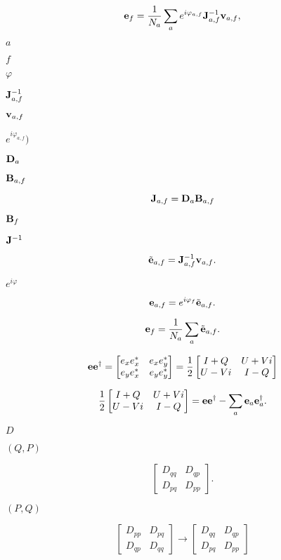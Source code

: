 \documentclass{article}
\begin{document}
\[ {\bf e}_f = \frac{1}{N_a} \sum_a e^{i\varphi_{a,f}} {\bf J}_{a,f}^{-1} {\bf v}_{a,f}, \]
\pagebreak

$a$
\pagebreak

$f$
\pagebreak

$\varphi$
\pagebreak

${\bf J}_{a,f}^{-1}$
\pagebreak

${\bf v}_{a,f}$
\pagebreak

$e^{i\varphi_{a,f}})$
\pagebreak

${\bf D}_a$
\pagebreak

${\bf B}_{a,f}$
\pagebreak

\[ {\bf J}_{a,f} = {\bf D}_a {\bf B}_{a,f} \]
\pagebreak

${\bf B}_f$
\pagebreak

${\bf J}^{-1}$
\pagebreak

\[ \tilde{\bf e}_{a,f} = {\bf J}^{-1}_{a,f} {\bf v}_{a,f}. \]
\pagebreak

$e^{i\varphi}$
\pagebreak

\[ {\bf e}_{a,f} = e^{i\varphi_f} \tilde{\bf e}_{a,f}. \]
\pagebreak

\[ {\bf e}_f = \frac{1}{N_a}\sum_a \tilde{\bf e}_{a,f}. \]
\pagebreak

\[ {\bf e}{\bf e}^\dagger = \begin{bmatrix} e_x e_x^\ast & e_x e_y^\ast \\ e_y e_x^\ast & e_y e_y^\ast \end{bmatrix} = \frac12 \begin{bmatrix} I + Q & U + Vi \\ U - Vi & I - Q \end{bmatrix} \]
\pagebreak

\[ \frac12 \begin{bmatrix} I + Q & U + Vi \\ U - Vi & I - Q \end{bmatrix} = {\bf e}{\bf e}^\dagger - \sum_a {\bf e}_a {\bf e}_a^\dagger. \]
\pagebreak

$D$
\pagebreak

$(Q,P)$
\pagebreak

\[\begin{bmatrix} D_{qq} & D_{qp} \\ D_{pq} & D_{pp} \end{bmatrix}.\]
\pagebreak

$(P,Q)$
\pagebreak

\[ \begin{bmatrix} D_{pp} & D_{pq} \\ D_{qp} & D_{qq} \end{bmatrix} \rightarrow \begin{bmatrix} D_{qq} & D_{qp} \\ D_{pq} & D_{pp} \end{bmatrix} \]
\pagebreak
\end{document}

